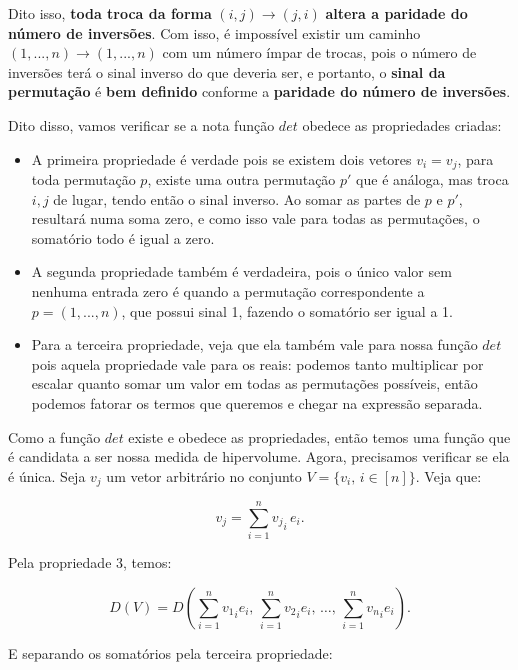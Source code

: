 \documentclass[11pt, a4paper]{article}
\begin{document}
Dito isso, \textbf{toda troca da forma} \((i,j) \rightarrow (j,i)\) \textbf{altera a paridade do número de inversões}. Com isso, é impossível existir um caminho \((1,...,n) \rightarrow (1,...,n)\) com um número ímpar de trocas, pois o número de inversões terá o sinal inverso do que deveria ser, e portanto, o \textbf{sinal da permutação} é \textbf{bem definido} conforme a \textbf{paridade do número de inversões}.

Dito disso, vamos verificar se a nota função \(det\) obedece as propriedades criadas:

\begin{itemize}
    \item A primeira propriedade é verdade pois se existem dois vetores \(v_i=v_j\), para toda permutação \(p\), existe uma outra permutação \(p'\) que é análoga, mas troca \(i,j\) de lugar, tendo então o sinal inverso. Ao somar as partes de \(p\) e \(p'\), resultará numa soma zero, e como isso vale para todas as permutações, o somatório todo é igual a zero.
    \item A segunda propriedade também é verdadeira, pois o único valor sem nenhuma entrada zero é quando a permutação correspondente a \(p=(1,...,n)\), que possui sinal 1, fazendo o somatório ser igual a 1.
    \item Para a terceira propriedade, veja que ela também vale para nossa função \(det\) pois aquela propriedade vale para os reais: podemos tanto multiplicar por escalar quanto somar um valor em todas as permutações possíveis, então podemos fatorar os termos que queremos e chegar na expressão separada.
\end{itemize}

Como a função \(det\) existe e obedece as propriedades, então temos uma função que é candidata a ser nossa medida de hipervolume. Agora, precisamos verificar se ela é única. Seja \(v_j\) um vetor arbitrário no conjunto \(V = \{v_i,\, i \in [n]\}\). Veja que:

\void[-0.7]

\[
v_j = \sum_{i=1}^{n} {v_j}_{i}\,e_i.
\]

\void[-0.7]

Pela propriedade 3, temos:

\void[-0.9]

\[
D(V) = D\left(\sum_{i=1}^{n} {v_1}_i e_i,\, \sum_{i=1}^{n} {v_2}_i e_i,\, \dots,\, \sum_{i=1}^{n} {v_n}_i e_i\right).
\]

\void[-0.6]

E separando os somatórios pela terceira propriedade:
\end{document}

